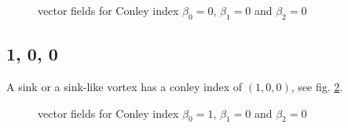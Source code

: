 \documentclass[a4paper,10pt,notitlepage]{scrartcl}
\begin{document}
\begin{figure}
  \centering
  \caption{vector fields for Conley index $\beta_0 = 0$, $\beta_1 = 0$ and
$\beta_2 = 0$}
  \label{fig:conley-000}
\end{figure}

\subsection*{1, 0, 0}

A sink or a sink-like vortex has a conley index of $(1, 0, 0)$, see fig.
\ref{fig:conley-100}.

\begin{figure}
  \centering
  \caption{vector fields for Conley index $\beta_0 = 1$, $\beta_1 = 0$ and
$\beta_2 = 0$}
  \label{fig:conley-100}
\end{figure}
\end{document}
